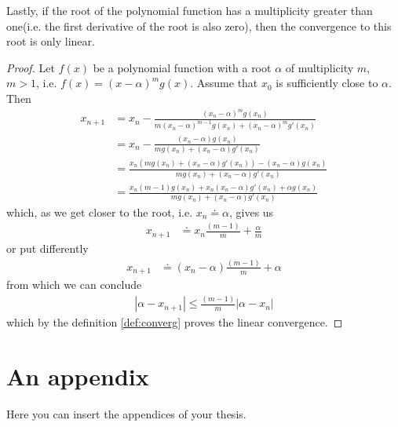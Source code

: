 \documentclass[
  digital, %
  table,   %
  nolof,     %
  nolot,     %
	draft, %
]{fithesis3}
\begin{document}
Lastly, if the root of the polynomial function has a multiplicity greater than one(i.e. the first derivative of the root is also zero), then the convergence to this root is only linear.
\begin{proof}
Let $f(x)$ be a polynomial function with a root $\alpha$ of multiplicity $m$, $m > 1$, i.e. $f(x) = (x-\alpha)^{m}g(x)$. Assume that $x_{0}$ is sufficiently close to $\alpha$. Then
\begin{align}
x_{n+1} &= x_{n} - \frac{(x_{n} - \alpha)^{m}g(x_{n})}{m(x_{n}-\alpha)^{m-1}g(x_{n}) + (x_{n}-\alpha)^{m}g'(x_{n})} \\
&= x_{n} - \frac{(x_{n} - \alpha)g(x_{n})}{mg(x_{n}) + (x_{n}-\alpha)g'(x_{n})} \\
&= \frac{x_{n}(mg(x_{n}) + (x_{n}-\alpha)g'(x_{n})) - (x_{n} - \alpha)g(x_{n})}{mg(x_{n}) + (x_{n}-\alpha)g'(x_{n})} \\
&= \frac{x_{n}(m - 1)g(x_{n}) + x_{n}(x_{n}-\alpha)g'(x_{n}) + {\alpha}g(x_{n})}{mg(x_{n}) + (x_{n}-\alpha)g'(x_{n})}
\end{align}
which, as we get closer to the root, i.e. $x_{n} \doteq \alpha$, gives us
\begin{align}
x_{n+1} &\doteq x_{n}\frac{(m - 1)}{m}+\frac{\alpha}{m}
\end{align}
or put differently
\begin{align}
x_{n+1} &\doteq (x_{n}-\alpha)\frac{(m - 1)}{m}+\alpha
\end{align}
from which we can conclude
\begin{align}
\left|\alpha - x_{n+1}\right| \leq \frac{(m - 1)}{m}\left|\alpha-x_{n}\right|
\end{align}
which by the definition \ref{def:converg} proves the linear convergence.
\end{proof}



%      

\printbibliography[heading=bibintoc]


  \makeatletter\thesis@blocks@clear\makeatother
  \printindex

\appendix %
\chapter{An appendix}
Here you can insert the appendices of your thesis.
\end{document}
